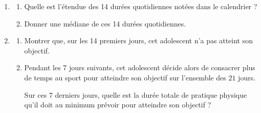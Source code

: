 \documentclass[exercice,a4]{thedocument}%
\begin{document}
\begin{enumerate}[resume]
\item
	\begin{enumerate}
		\item Quelle est l'étendue des 14 durées quotidiennes notées dans le calendrier ?
		\item Donner une médiane de ces 14 durées quotidiennes.
	\end{enumerate}
\item
	\begin{enumerate}
		\item Montrer que, sur les 14 premiers jours, cet adolescent n'a pas atteint son objectif.
		\item Pendant les 7 jours suivants, cet adolescent décide alors de consacrer plus de temps au sport pour atteindre son objectif sur l'ensemble des $21$ jours.

Sur ces 7 derniers jours, quelle est la durée totale de pratique physique qu'il doit au minimum prévoir pour atteindre son objectif ?
	\end{enumerate}
\end{enumerate}

\bigskip

\showthesource
\end{document}
